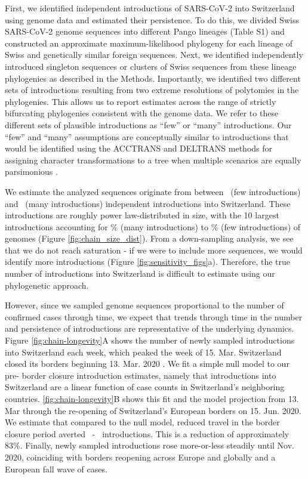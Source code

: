\documentclass[11pt,twoside,lineno]{pnas-new} %
\begin{document}
First, we identified independent introductions of SARS-CoV-2 into Switzerland using genome data and estimated their persistence. To do this, we divided Swiss SARS-CoV-2 genome sequences into different Pango lineages \cite{Rambaut2020} (Table S1) and constructed an approximate maximum-likelihood phylogeny for each lineage of Swiss and genetically similar foreign sequences. Next, we identified independently introduced singleton sequences or clusters of Swiss sequences from these lineage phylogenies as described in the Methods. Importantly, we identified two different sets of introductions resulting from two extreme resolutions of polytomies in the phylogenies. This allows us to report estimates across the range of strictly bifurcating phylogenies consistent with the genome data. We refer to these different sets of plausible introductions as ``few'' or ``many'' introductions. Our ``few'' and ``many'' assumptions are conceptually similar to introductions that would be identified using the ACCTRANS and DELTRANS methods for assigning character transformations to a tree when multiple scenarios are equally parsimonious \cite{Miyakawa2004} .

We estimate the analyzed sequences originate from between \nchainsmin\ (few introductions) and \nchainsmax\ (many introductions) independent introductions into Switzerland. These introductions are roughly power law-distributed in size, with the 10 largest introductions accounting for \maxlargestchainsper\% (many introductions) to \minlargestchainsper\% (few introductions) of genomes (Figure \ref{fig:chain_size_dist}). From a down-sampling analysis, we see that we do not reach saturation - if we were to include more sequences, we would identify more introductions (Figure \ref{fig:sensitivity_figs}a). Therefore, the true number of introductions into Switzerland is difficult to estimate using our phylogenetic approach. 

However, since we sampled genome sequences proportional to the number of confirmed cases through time, we expect that trends through time in the number and persistence of introductions are representative of the underlying dynamics. Figure \ref{fig:chain-longevity}A shows the number of newly sampled introductions into Switzerland each week, which peaked the week of 15. Mar. Switzerland closed its borders beginning 13. Mar. 2020 \cite{SWI-border-closure}. We fit a simple null model to our pre- border closure introduction estimates, namely that introductions into Switzerland are a linear function of case counts in Switzerland's neighboring countries. \ref{fig:chain-longevity}B shows this fit and the model projection from 13. Mar through the re-opening of Switzerland's European borders on 15. Jun. 2020. We estimate that compared to the null model, reduced travel in the border closure period averted \introsavertedmin\ - \introsavertedmax\ introductions. This is a reduction of approximately 83\%. Finally, newly sampled introductions rose more-or-less steadily until Nov. 2020, coinciding with borders reopening across Europe and globally and a European fall wave of cases. 
\end{document}
